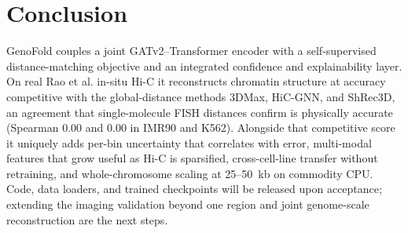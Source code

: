 \documentclass[conference]{IEEEtran}
\providecommand{\fishgeno}{0.00}
\providecommand{\fishgenok}{0.00}
\begin{document}
\section{Conclusion}
GenoFold couples a joint GATv2--Transformer encoder with a self-supervised
distance-matching objective and an integrated confidence and explainability layer.
On real Rao et al. in-situ Hi-C it reconstructs chromatin structure at accuracy
competitive with the global-distance methods 3DMax, HiC-GNN, and ShRec3D, an agreement
that single-molecule FISH distances confirm is physically accurate (Spearman \fishgeno{}
and \fishgenok{} in IMR90 and K562). Alongside that competitive score it uniquely adds
per-bin uncertainty that correlates with error, multi-modal features that grow useful as
Hi-C is sparsified, cross-cell-line transfer without retraining, and whole-chromosome
scaling at 25--50~kb on commodity CPU.
Code, data loaders, and trained checkpoints will be released upon acceptance;
extending the imaging validation beyond one region and joint genome-scale
reconstruction are the next steps.

\end{document}
